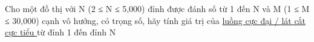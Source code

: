 Cho một đồ thị với N (2 ≤ N ≤ 5,000) đỉnh được đánh số từ 1 đến N và M (1 ≤ M ≤ 30,000) cạnh vô hướng, có trọng số, hãy tính giá trị của   \href{http://en.wikipedia.org/wiki/Maximum_flow_problem}{    luồng cực đại / lát cắt cực tiểu   }   từ đỉnh 1 đến đỉnh N  

\